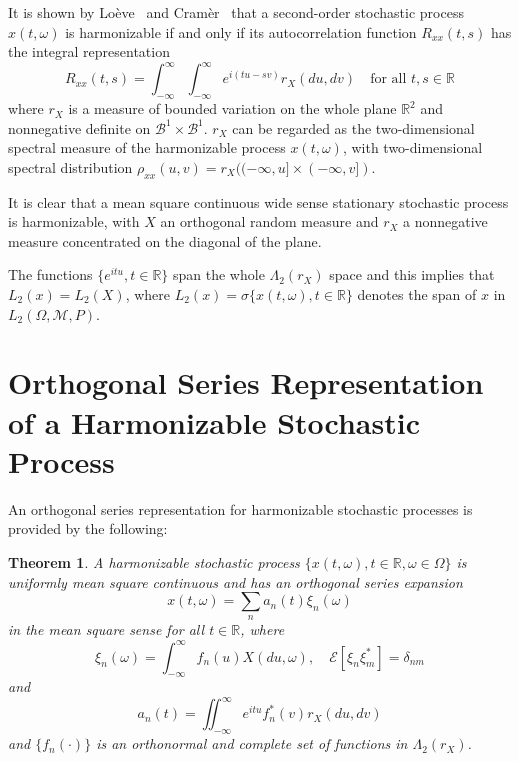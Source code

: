 \documentclass{article}
\newtheorem{theorem}{Theorem}
\begin{document}
It is shown by Lo{\`e}ve~{\cite{loeve1963}} and Cram{\`e}r~{\cite{cramer1951}}
that a second-order stochastic process $x (t, \omega)$ is harmonizable if and
only if its autocorrelation function $R_{xx} (t, s)$ has the integral
representation
\begin{equation}
  R_{xx} (t, s) = \int_{- \infty}^{\infty} \int_{- \infty}^{\infty} e^{i (tu -
  sv)} r_X (du, dv)  \quad \text{for all } t, s \in \mathbb{R}
  \label{eq:autocorr}
\end{equation}
where $r_X$ is a measure of bounded variation on the whole plane
$\mathbb{R}^2$ and nonnegative definite on $\mathscr{B}^1 \times
\mathscr{B}^1$. $r_X$ can be regarded as the two-dimensional spectral measure
of the harmonizable process $x (t, \omega)$, with two-dimensional spectral
distribution $\rho_{xx} (u, v) = r_X  ((- \infty, u] \times (- \infty, v])$.

It is clear that a mean square continuous wide sense stationary stochastic
process is harmonizable, with $X$ an orthogonal random measure and $r_X$ a
nonnegative measure concentrated on the diagonal of the plane.

The functions $\{e^{itu}, t \in \mathbb{R}\}$ span the whole $\Lambda_2 (r_X)$
space and this implies that $L_2 (x) = L_2 (X)$, where $L_2 (x) = \sigma \{x
(t, \omega), t \in \mathbb{R}\}$ denotes the span of $x$ in $L_2 (\Omega,
\mathscr{M}, P)$.

\section{Orthogonal Series Representation of a Harmonizable Stochastic
Process}\label{sec:orthogonal-series}

An orthogonal series representation for harmonizable stochastic processes is
provided by the following:

\begin{theorem}
  \label{thm:series-rep}A harmonizable stochastic process $\{x (t, \omega), t
  \in \mathbb{R}, \omega \in \Omega\}$ is uniformly mean square continuous and
  has an orthogonal series expansion
  \begin{equation}
    x (t, \omega) = \sum_n a_n (t) \xi_n (\omega) \label{eq:series}
  \end{equation}
  in the mean square sense for all $t \in \mathbb{R}$, where
  \begin{equation}
    \xi_n (\omega) = \int_{- \infty}^{\infty} f_n (u) X (du, \omega), \quad
    \mathscr{E} [\xi_n \xi_m^{\ast}] = \delta_{nm} \label{eq:xin}
  \end{equation}
  and
  \begin{equation}
    a_n (t) = \iint_{- \infty}^{\infty} e^{itu} f_n^{\ast} (v) r_X (du, dv)
    \label{eq:an}
  \end{equation}
  and $\{f_n (\cdot)\}$ is an orthonormal and complete set of functions in
  $\Lambda_2 (r_X)$.
\end{theorem}
\end{document}
